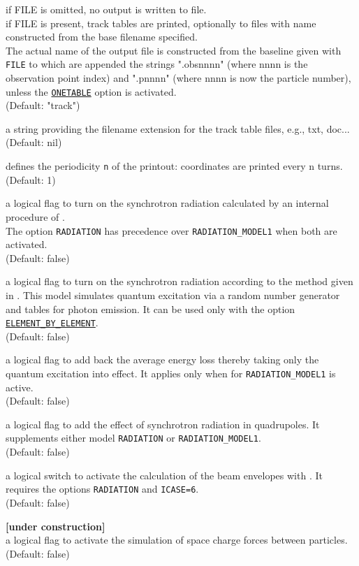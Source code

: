 \begin{madlist}
    if FILE is omitted, no output is written to file.\\
   if FILE is present, track tables are printed, optionally to 
   files with name constructed from the base filename specified. \\
   The actual name of the output file is constructed from
   the baseline given with \texttt{FILE} to which are appended the
   strings ".obsnnnn" (where nnnn is the observation point index) and
   ".pnnnn" (where nnnn is now the particle number), unless the
   \hyperref[opt:onetable]{\texttt{ONETABLE}} option is activated.  \\
   (Default: "track") 

    a string providing the filename extension for the
   track table files, e.g., txt, doc...  \\ (Default: nil)

    defines the periodicity \texttt{n} of the printout:
   coordinates are printed every n turns. \\ (Default: 1)

   \label{opt:radiation} a logical flag to turn on
     the synchrotron radiation calculated by an internal procedure of
     \ptc. \\
     The option \texttt{RADIATION} has precedence over \texttt{RADIATION\_MODEL1}
     when both are activated. 
     \\ (Default: false)

    a logical flag to turn on the synchrotron
   radiation according to the method given in \cite{roy1990}. This model
   simulates quantum excitation via a random number generator and tables
   for photon emission. It can be used only with the option
   \hyperref[opt:element-by-element]{\texttt{ELEMENT\_BY\_ELEMENT}}.\\ 
   (Default: false) 

    a logical flag to add back the
   average energy loss thereby taking only the quantum excitation into
   effect. It applies only when for \texttt{RADIATION\_MODEL1} is
   active.\\
   (Default: false)

    a logical flag to add the effect of
   synchrotron radiation in quadrupoles. It supplements either model
   \texttt{RADIATION} or \texttt{RADIATION\_MODEL1}. \\
   (Default: false)

    a logical switch to activate the calculation
   of the beam envelopes with \ptc. It requires the options
   \texttt{RADIATION} and \texttt{ICASE=6}.\\
   (Default: false)

    \textbf{[under construction]}\\
     a logical flag to activate the simulation of space charge forces
     between particles. \\ (Default: false)  
\end{madlist}


